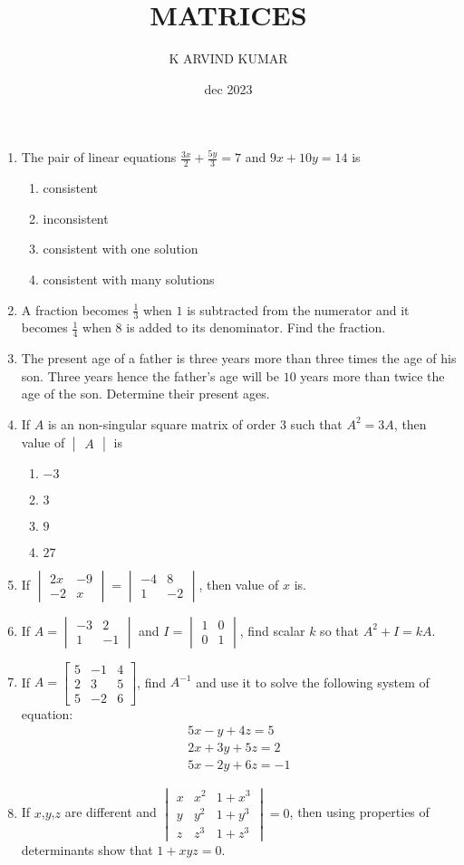 \documentclass[12pt,-letter paper]{article}
\title{MATRICES}
\author{K ARVIND KUMAR}
\date{dec 2023}
\providecommand{\mydet}[1]{\ensuremath{\begin{vmatrix}#1\end{vmatrix}}}
\providecommand{\myvec}[1]{\ensuremath{\begin{bmatrix}#1\end{bmatrix}}}
\begin{document}
\maketitle
\begin{enumerate}
\item The pair of linear equations
$\frac{3x}{2}+\frac{5y}{3}=7$ and $9x+10y=14$ is
\begin{enumerate}[label=(\alph*)]
\item consistent
\item inconsistent
\item consistent with one solution 
\item consistent with many solutions 
\end{enumerate}
\item A fraction becomes $\frac{1}{3}$ when $1$ is subtracted from the numerator and it becomes $\frac{1}{4}$ when $8$ is added to its denominator. Find the fraction.
\item The present age of a father is three years more than three times the age of his son. Three years hence the father's age will be $10$ years more than twice the age of the son. Determine their present ages.
\item If $A$ is an non-singular square matrix  of order $3$ such that $A^2=3A$, then value of $\mydet{A}$ is\\
\begin{enumerate}[label=(\alph*)]
\item $-3$
\item $3$
\item $9$
\item $27$
\end{enumerate}
\item If $\mydet{2x&-9\\ -2&x}=\mydet{-4&8\\ 1&-2}$, then value of $x$ is. 	
\item If $A=\mydet{-3&2\\ 1&-1}$ and $I=\mydet{1&0\\ 0&1}$, find scalar $k$ so that $A^2+I=kA$.
\item If $A= \myvec{5&-1&4\\ 2&3&5\\ 5&-2&6}$, find $A^{-1}$ and use it to solve the following system of equation: 
		\begin{align}
			5x-y+4z=5\\
			2x+3y+5z=2\\
			5x-2y+6z=-1
		\end{align}
\item If $x$,$y$,$z$ are different and $\mydet{x&x^{2}&1+x^{3}\\ y&y^{2}&1+y^{3}\\ z&z^{3}&1+z^{3}}=0$, then using properties of determinants show that $1+xyz=0$.
\end{enumerate}
\end{document}
